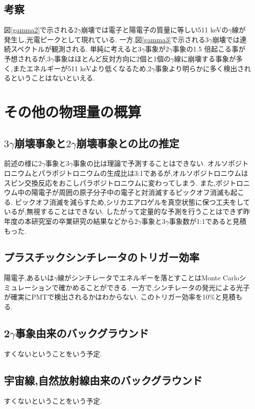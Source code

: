 \subsection{考察}
図\ref{gamma2}で示される2$\gamma$崩壊では電子と陽電子の質量に等しい511 keVの$\gamma$線が発生し,光電ピークとして現れている.
一方,図\ref{gamma3}で示される$3\gamma$崩壊では連続スペクトルが観測される.
単純に考えると$3\gamma$事象が$2\gamma$事象の1.5 倍起こる事が予想されるが,$3\gamma$事象はほとんど反対方向に2個と1個の$\gamma$線に崩壊する事象が多く,またエネルギーが511 keVより低くなるため,$2\gamma$事象より明らかに多く検出されるということはないといえる.


\section{その他の物理量の概算}
\label{section_other}

\subsection{$3\gamma$崩壊事象と$2\gamma$崩壊事象との比の推定}
前述の様に$2\gamma$事象と$3\gamma$事象の比は理論で予測することはできない.
オルソポジトロニウムとパラポジトロニウムの生成比は3:1であるが,オルソポジトロニウムはスピン交換反応をおこしパラポジトロニウムに変わってしまう.
また,ポジトロニウム中の陽電子が周囲の原子分子中の電子と対消滅するピックオフ消滅も起こる.
ピックオフ消滅を減らすため,シリカエアロゲルを真空状態に保つ工夫をしているが,無視することはできない.
したがって定量的な予測を行うことはできず昨年度の本研究室の卒業研究の結果などから$2\gamma$事象と$3\gamma$事象数が1:1であると見積もった.

\subsection{プラスチックシンチレータのトリガー効率}
陽電子,あるいは$\gamma$線がシンチレータでエネルギーを落とすことはMonte Carloシミュレーションで確かめることができる.
一方で,シンチレータの発光による光子が確実にPMTで検出されるかはわからない.
このトリガー効率を10\%と見積もる.

\subsection{2$\gamma$事象由来のバックグラウンド}
すくないということをいう予定.

\subsection{宇宙線,自然放射線由来のバックグラウンド}
すくないということをいう予定.\cite{小早川201207}

